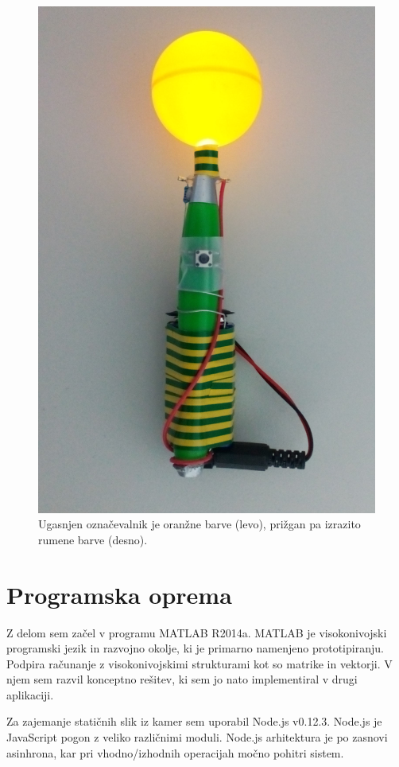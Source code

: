 \documentclass[a4paper, 12pt]{book}
\begin{document}
\begin{figure}[H]
\includegraphics[scale=0.4]{marker_on.png}
\caption{Ugasnjen označevalnik je oranžne barve (levo), prižgan pa izrazito rumene barve (desno).}
\end{figure}

\section{Programska oprema}
Z delom sem začel v programu MATLAB R2014a. MATLAB je visokonivojski programski jezik in razvojno okolje, ki je primarno namenjeno prototipiranju. Podpira računanje z visokonivojskimi strukturami kot so matrike in vektorji. V njem sem razvil konceptno rešitev, ki sem jo nato implementiral v drugi aplikaciji. 

Za zajemanje statičnih slik iz kamer sem uporabil Node.js v0.12.3. Node.js je JavaScript pogon z veliko različnimi moduli. Node.js arhitektura je po zasnovi asinhrona, kar pri vhodno/izhodnih operacijah močno pohitri sistem.
\end{document}
